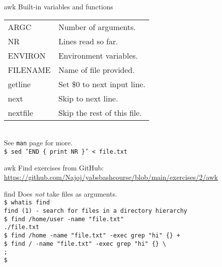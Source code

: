 \documentclass{beamer}
\let\tt\texttt
\let\it\itshape
\begin{document}
\begin{frame}{awk}
        Built-in variables and functions\\
        \begin{tabular}{l|l}
                \hline
            ARGC     & Number of arguments. \\
            NR       & Lines read so far.   \\
            ENVIRON  & Environment variables. \\
            FILENAME & Name of file provided. \\
                \hline
            getline  & Set \$0 to next input line. \\
            next     & Skip to next line. \\
            nextfile & Skip the rest of this file. \\
                \hline
        \end{tabular} \\
        \medskip
        See \tt{man} page for more. \\
        \tt{\$ sed 'END \{ print NR \}' < file.txt} \\
\end{frame}

\begin{frame}{awk}
        Find exercises from GitHub: \\
        \url{https://github.com/Najoj/yabsbashcourse/blob/main/exercises/2/awk}
\end{frame}

\begin{frame}{find}
        Does {\it not} take files as arguments. \\
        \tt{\$ whatis find}\\
        \tt{find (1)  - search for files in a directory hierarchy}\\
        \tt{\$ find /home/user -name "file.txt"} \\
        \tt{./file.txt} \\
        \tt{\$ find /home -name "file.txt" -exec grep "hi" \{\} + } \\
        \tt{\$ find / -name "file.txt" -exec grep "hi" \{\} {\textbackslash}\\; } \\
        \tt{\$ } \\
\end{frame}
\end{document}
